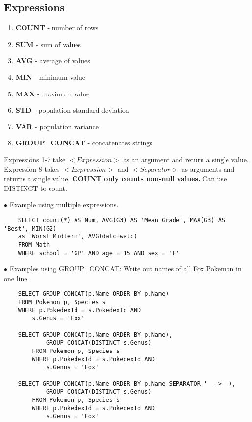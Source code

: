 \documentclass[twoside]{article}
\begin{document}
\subsection*{Expressions}
\begin{enumerate}
    \item \textbf{COUNT} - number of rows
    \item \textbf{SUM} - sum of values
    \item \textbf{AVG} - average of values
    \item \textbf{MIN} - minimum value
    \item \textbf{MAX} - maximum value
    \item \textbf{STD} - population standard deviation
    \item \textbf{VAR} - population variance
    \item \textbf{GROUP\_CONCAT} - concatenates strings
\end{enumerate}
Expressions 1-7 take $<Expression>$ as an argument and return a single value.
Expression 8 takes $<Expression>$ and $<Separator>$ as arguments and returns a
single value. \textbf{COUNT only counts non-null values.} Can use DISTINCT to 
count.

$\bullet$ Example using multiple expressions.
\begin{verbatim}
    SELECT count(*) AS Num, AVG(G3) AS 'Mean Grade', MAX(G3) AS 'Best', MIN(G2)
    as 'Worst Midterm', AVG(dalc+walc)
    FROM Math
    WHERE school = 'GP' AND age = 15 AND sex = 'F'
\end{verbatim}

$\bullet$ Examples using GROUP\_CONCAT: Write out names of all Fox Pokemon in
one line.
\begin{verbatim}
    SELECT GROUP_CONCAT(p.Name ORDER BY p.Name)
    FROM Pokemon p, Species s
    WHERE p.PokedexId = s.PokedexId AND
        s.Genus = 'Fox'
        
    SELECT GROUP_CONCAT(p.Name ORDER BY p.Name),
            GROUP_CONCAT(DISTINCT s.Genus)
        FROM Pokemon p, Species s
        WHERE p.PokedexId = s.PokedexId AND
            s.Genus = 'Fox'
            
    SELECT GROUP_CONCAT(p.Name ORDER BY p.Name SEPARATOR ' --> '),
            GROUP_CONCAT(DISTINCT s.Genus)
        FROM Pokemon p, Species s
        WHERE p.PokedexId = s.PokedexId AND
            s.Genus = 'Fox'
\end{verbatim}

\newpage
\hfill \break
{}
\end{document}
